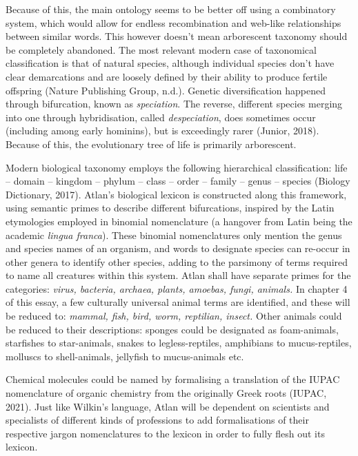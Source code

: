 Because of this, the main ontology seems to be better off using a combinatory system, which would allow for endless recombination and web-like relationships between similar words. This however doesn’t mean arborescent taxonomy should be completely abandoned. The most relevant modern case of taxonomical classification is that of natural species, although individual species don’t have clear demarcations and are loosely defined by their ability to produce fertile offspring (Nature Publishing Group, n.d.). Genetic diversification happened through bifurcation, known as {\it speciation}. The reverse, different species merging into one through hybridisation, called {\it despeciation}, does sometimes occur (including among early hominins), but is exceedingly rarer (Junior, 2018). Because of this, the evolutionary tree of life is primarily arborescent. 

Modern biological taxonomy employs the following hierarchical classification: life – domain – kingdom – phylum – class – order – family – genus – species (Biology Dictionary, 2017). Atlan’s biological lexicon is constructed along this framework, using semantic primes to describe different bifurcations, inspired by the Latin etymologies employed in binomial nomenclature (a hangover from Latin being the academic {\it lingua franca}). These binomial nomenclatures only mention the genus and species names of an organism, and words to designate species can re-occur in other genera to identify other species, adding to the parsimony of terms required to name all creatures within this system. Atlan shall have separate primes for the categories: \textit{virus, bacteria, archaea, plants, amoebas, fungi, animals.} In chapter 4 of this essay, a few culturally universal animal terms are identified, and these will be reduced to: \textit{mammal, fish, bird, worm, reptilian, insect.} Other animals could be reduced to their descriptions: sponges could be designated as foam-animals, starfishes to star-animals, snakes to legless-reptiles, amphibians to mucus-reptiles, molluscs to shell-animals, jellyfish to mucus-animals etc.  

Chemical molecules could be named by formalising a translation of the IUPAC nomenclature of organic chemistry from the originally Greek roots (IUPAC, 2021). Just like Wilkin’s language, Atlan will be dependent on scientists and specialists of different kinds of professions to add formalisations of their respective jargon nomenclatures to the lexicon in order to fully flesh out its lexicon. 

